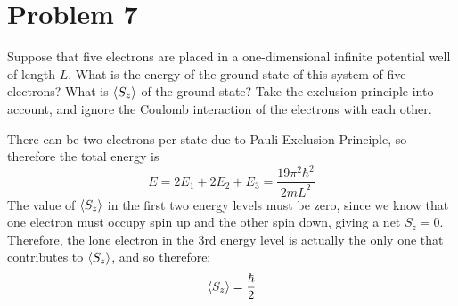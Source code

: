\documentclass[10pt]{article}
\begin{document}
    \pagebreak


    \section*{Problem 7}

    Suppose that five electrons are placed in a one-dimensional infinite potential well of length $L$. What is the energy of the ground state of this system of five electrons? What is $\langle S_z \rangle$ of the ground state? Take the exclusion principle into account, and ignore the Coulomb interaction of the electrons with each other.

    \begin{solution}
        There can be two electrons per state due to Pauli Exclusion Principle, so therefore the total energy is 
        \[ E = 2E_1 + 2E_2 + E_3 = \frac{19 \pi^2 \hbar^2}{2mL^2}\]
        The value of $\langle S_z \rangle$ in the first two energy levels must be zero, since we know that one electron must occupy spin up and the other spin down, giving a net $S_z = 0$. Therefore, the lone electron in the 3rd energy level is actually the only one that contributes to $\langle S_z \rangle$, and so therefore: 
        \[ \langle S_z \rangle = \frac \hbar 2\] 
    \end{solution}
\end{document}
